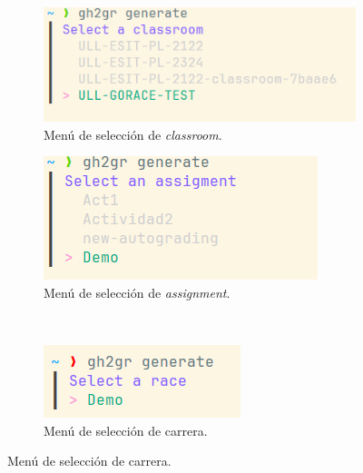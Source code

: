 \begin{figure}
    \centering
    \begin{subfigure}{0.4\textwidth}
        \includegraphics[width=1\linewidth]{images/client-generate-1.png}
        \caption{Menú de selección de \textit{classroom}.}
        \label{fig:client-generate-1}
    \end{subfigure}
    \hspace*{\fill}   %
    \begin{subfigure}{0.4\textwidth}
        \includegraphics[width=1\linewidth]{images/client-generate-2.png}
        \caption{Menú de selección de \textit{assignment}.}
        \label{fig:client-generate-2}
    \end{subfigure}
    \\
    \begin{subfigure}{0.4\textwidth}
        \includegraphics[width=1\linewidth]{images/client-generate-3.png}
        \caption{Menú de selección de carrera.}

\end{subfigure}
\end{figure}
